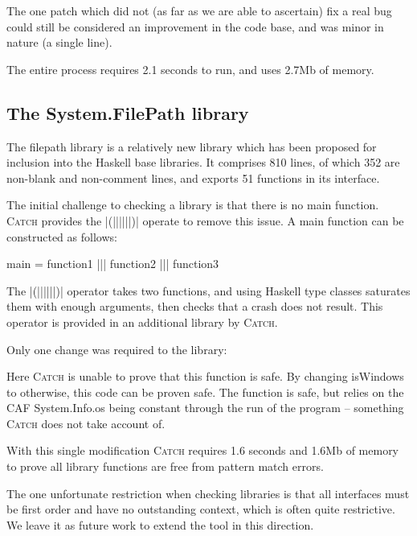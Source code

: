 \documentclass[preprint]{sigplanconf}
\newcommand{\C}[1]{\textsf{#1}}
\newcommand{\catch}{\textsc{Catch}}
\begin{document}
The one patch which did not (as far as we are able to ascertain) fix a real bug could still be considered an improvement in the code base, and was minor in nature (a single line).

The entire process requires 2.1 seconds to run, and uses 2.7Mb of memory.

\subsection{The System.FilePath library}
\label{sec:filepath}

The filepath library is a relatively new library which has been proposed for inclusion into the Haskell base libraries. It comprises 810 lines, of which 352 are non-blank and non-comment lines, and exports 51 functions in its interface.

The initial challenge to checking a library is that there is no \C{main} function. \catch{} provides the |(||||||)| operate to remove this issue. A \C{main} function can be constructed as follows:

\begin{code}
main = function1 ||| function2 ||| function3
\end{code}

The |(||||||)| operator takes two functions, and using Haskell type classes saturates them with enough arguments, then checks that a crash does not result. This operator is provided in an additional library by \catch{}.

Only one change was required to the library:


Here \catch{} is unable to prove that this function is safe. By changing \C{isWindows} to \C{otherwise}, this code can be proven safe. The function is safe, but relies on the CAF \C{System.Info.os} being constant through the run of the program -- something \catch{} does not take account of.

With this single modification \catch{} requires 1.6 seconds and 1.6Mb of memory to prove all library functions are free from pattern match errors.

The one unfortunate restriction when checking libraries is that all interfaces must be first order and have no outstanding context, which is often quite restrictive. We leave it as future work to extend the tool in this direction.
\end{document}
